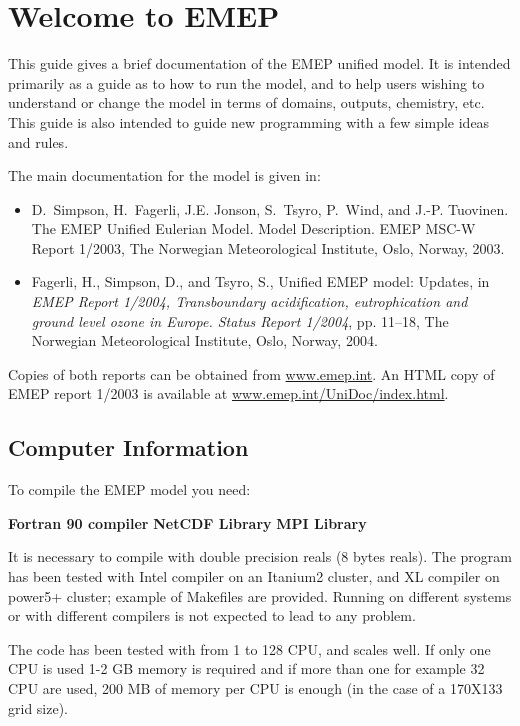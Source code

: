 \chapter{Welcome to EMEP }

This guide gives a brief documentation of the EMEP unified model.
It is intended primarily as a guide as to how to run the model, and
to help users wishing to understand or change 
the model in terms of domains, outputs, chemistry, etc.
This guide is also intended to guide new programming with a few
simple ideas and rules.

The main documentation for the model is given in:

\begin{itemize}
\item
D.~Simpson, H.~Fagerli, J.E. Jonson, S.~Tsyro, P.~Wind, and J.-P. Tuovinen.
{The EMEP Unified Eulerian Model. Model Description}.
EMEP MSC-W Report 1/2003, The Norwegian
Meteorological Institute, Oslo, Norway, 2003.
\item
Fagerli, H., Simpson, D., and Tsyro, S., {Unified EMEP model: Updates}, in {\em
  EMEP Report 1/2004, Transboundary acidification, eutrophication and ground
  level ozone in Europe. Status Report 1/2004\/}, pp. 11--18, The Norwegian
  Meteorological Institute, Oslo, Norway, 2004.
\end{itemize}

Copies of both reports can be obtained from \url{www.emep.int}. An HTML
copy of EMEP report 1/2003 is available at \url{www.emep.int/UniDoc/index.html}.


\section{Computer Information}

To compile the EMEP model you need:

\textbf{Fortran 90 compiler}
\textbf{NetCDF Library}
\textbf{MPI Library}

It is necessary to compile with double precision reals (8 bytes
reals).  The program has been tested with Intel compiler on an
Itanium2 cluster, and XL compiler on power5+ cluster; example of
Makefiles are provided. Running on different systems or with different
compilers is not expected to lead to any problem.

The code has been tested with from 1 to 128 CPU, and scales well.  If
only one CPU is used 1-2 GB memory is required and if more than one
for example 32 CPU are used, 200 MB of memory per CPU is enough (in
the case of a 170X133 grid size).

